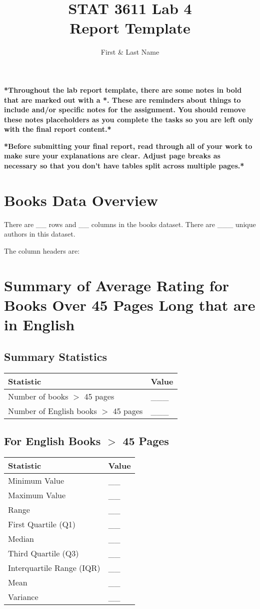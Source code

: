 \documentclass[12pt]{article}
\title{STAT 3611 Lab 4 \\ Report Template}
\author{First \& Last Name}
\date{}
\begin{document}
\maketitle

\textbf{*Throughout the lab report template, there are some notes in bold that are marked out with a *. These are reminders about things to include and/or specific notes for the assignment. You should remove these notes placeholders as you complete the tasks so you are left only with the final report content.*}

\textbf{*Before submitting your final report, read through all of your work to make sure your explanations are clear. Adjust page breaks as necessary so that you don’t have tables split across multiple pages.*}

\section*{Books Data Overview}
There are \_\_ rows and \_\_ columns in the books dataset. There are \_\_\_ unique authors in this dataset.

The column headers are: 


\section*{Summary of Average Rating for Books Over 45 Pages Long that are in English}

\subsection*{Summary Statistics}
\begin{tabular}{l l}
    \toprule
    \textbf{Statistic} & \textbf{Value} \\
    \midrule
    Number of books $>$ 45 pages & \_\_\_ \\
    Number of English books $>$ 45 pages & \_\_\_ \\
    \bottomrule
\end{tabular}

\subsection*{For English Books $>$ 45 Pages}
\begin{tabular}{l l}
    \toprule
    \textbf{Statistic} & \textbf{Value} \\
    \midrule
    Minimum Value & \_\_ \\
    Maximum Value & \_\_ \\
    Range & \_\_ \\
    First Quartile (Q1) & \_\_ \\
    Median & \_\_ \\
    Third Quartile (Q3) & \_\_ \\
    Interquartile Range (IQR) & \_\_ \\
    Mean & \_\_ \\
    Variance & \_\_ \\
    \bottomrule
\end{tabular}
\end{document}
